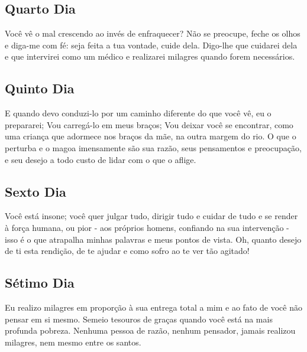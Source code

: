 \documentclass[18pt]{article}
\begin{document}
\textbf{}

\subsection{Quarto Dia}
\textbf{}

Você vê o mal crescendo ao invés de enfraquecer? Não se preocupe, feche os olhos e diga-me com fé: seja feita a tua vontade, cuide dela. Digo-lhe que cuidarei dela e que intervirei como um médico e realizarei milagres quando forem necessários.

\textbf{}

\subsection{Quinto Dia}
\textbf{}

E quando devo conduzi-lo por um caminho diferente do que você vê, eu o prepararei; Vou carregá-lo em meus braços; Vou deixar você se encontrar, como uma criança que adormece nos braços da mãe, na outra margem do rio. O que o perturba e o magoa imensamente são sua razão, seus pensamentos e preocupação, e seu desejo a todo custo de lidar com o que o aflige.

\textbf{}

\subsection{Sexto Dia}
\textbf{}

Você está insone; você quer julgar tudo, dirigir tudo e cuidar de tudo e se render à força humana, ou pior - aos próprios homens, confiando na sua intervenção - isso é o que atrapalha minhas palavras e meus pontos de vista. Oh, quanto desejo de ti esta rendição, de te ajudar e como sofro ao te ver tão agitado!

\textbf{}

\subsection{Sétimo Dia}
\textbf{}

Eu realizo milagres em proporção à sua entrega total a mim e ao fato de você não pensar em si mesmo. Semeio tesouros de graças quando você está na mais profunda pobreza. Nenhuma pessoa de razão, nenhum pensador, jamais realizou milagres, nem mesmo entre os santos.
\end{document}
